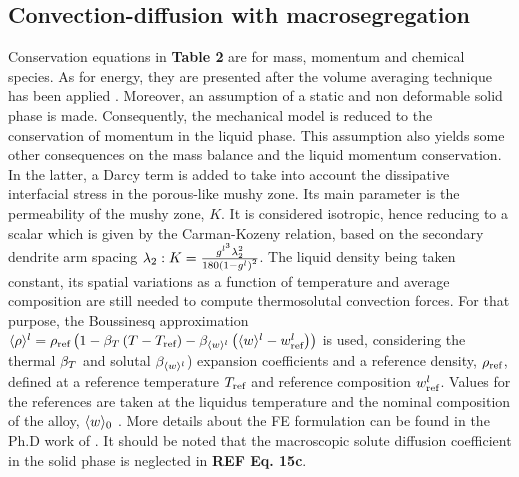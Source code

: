 \subsection{Convection-diffusion with macrosegregation}
Conservation equations in \textbf{Table 2} are for mass, momentum and chemical species. 
As for energy, they are presented after the volume averaging technique has been applied 
\citep{ni_volume-averaged_1991, dantzig_solidification_2009}. Moreover, an assumption 
of a static and non deformable solid phase is made. Consequently, the mechanical model is 
reduced to the conservation of momentum in the liquid phase. This assumption also yields 
some other consequences on the mass balance and the liquid momentum conservation. In the 
latter, a Darcy term is added to take into account the dissipative interfacial stress in 
the porous-like mushy zone. Its main parameter is the permeability of the mushy zone, $K$. 
It is considered isotropic, hence reducing to a scalar which is given by the Carman-Kozeny 
relation, based on the secondary dendrite arm spacing $\lambda_2: K= \frac{g^{l^3}  \lambda_2^{2}
 }{180\left( 1-g^l \right)^2}$. The liquid density being taken constant, its spatial variations 
as a function of temperature and average composition are still needed to compute thermosolutal 
convection forces. For that purpose, the Boussinesq approximation $\langle  \rho  \rangle^l = \rho_{\text{ref}} \left( 1-\beta_T 
\left( T-T_{\text{ref}} \right)-\beta_{\langle w \rangle^l} \left( \langle w \rangle^l-w_{\text{ref}}^l \right) \right)$ is used, considering the thermal $\beta_T$ and solutal $\beta_{\langle w \rangle^l}$) expansion coefficients 
and a reference density, $\rho_{\text{ref}}$, defined at a reference temperature $T_{\text{ref}}$ and reference 
composition $w_{\text{ref}}^l$. Values for the references are taken at the liquidus temperature and the nominal 
composition of the alloy, $\langle w \rangle_0$ \citep{carozzani_direct_2013}. More details about the FE formulation can be found in 
the Ph.D work of \citet{rivaux_simulation_2011, carozzani_developpement_2012}. It should be noted that the macroscopic 
solute diffusion coefficient in the solid phase is neglected in \textbf{REF Eq. 15c}. 


